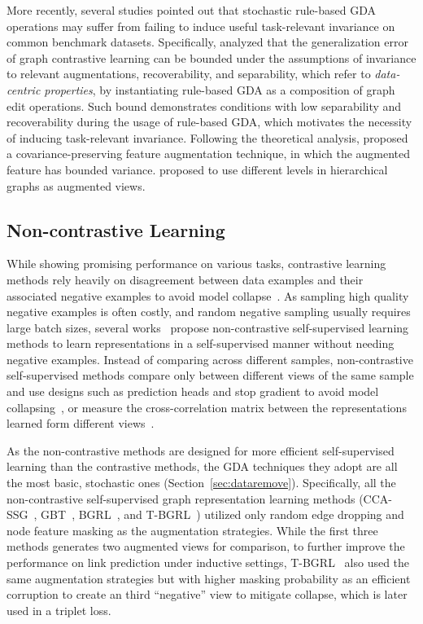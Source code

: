 \documentclass[11pt]{article}
\begin{document}
More recently, several studies \cite{suresh2021adversarial, trivedianalyzing,liu2023data} pointed out that stochastic rule-based GDA operations may suffer from failing to induce useful task-relevant invariance on common benchmark datasets. Specifically, \citet{trivedianalyzing} analyzed that the generalization error of graph contrastive learning can be bounded under the assumptions of invariance to relevant augmentations, recoverability, and separability, which refer to \textit{data-centric properties}, by instantiating rule-based GDA as a composition of graph edit operations. Such bound demonstrates conditions with low separability and recoverability during the usage of rule-based GDA, which motivates the necessity of inducing task-relevant invariance. 
Following the theoretical analysis, \citet{zhang2022costa} proposed a covariance-preserving feature augmentation technique, in which the augmented feature has bounded variance. \citet{wang2021multi} proposed to use different levels in hierarchical graphs as augmented views.

\subsection{Non-contrastive Learning}
\label{sec:noncontrastive}
While showing promising performance on various tasks, contrastive learning methods rely heavily on disagreement between data examples and their associated negative examples to avoid model collapse~\cite{grill2020bootstrap}. As sampling high quality negative examples is often costly, and random negative sampling usually requires large batch sizes, several works~\cite{grill2020bootstrap,zbontar2021barlow,balestriero2022contrastive} propose non-contrastive self-supervised learning methods to learn representations in a self-supervised manner without needing negative examples. Instead of comparing across different samples, non-contrastive self-supervised methods compare only between different views of the same sample and use designs such as prediction heads and stop gradient to avoid model collapsing~\cite{grill2020bootstrap}, or measure the cross-correlation matrix between the representations learned form different views~\cite{zbontar2021barlow}.

As the non-contrastive methods are designed for more efficient self-supervised learning than the contrastive methods, the GDA techniques they adopt are all the most basic, stochastic ones (Section~\ref{sec:dataremove}). Specifically, all the non-contrastive self-supervised graph representation learning methods (CCA-SSG~\cite{zhang2021canonical}, GBT~\cite{bielak2022graph}, BGRL~\cite{thakoor2022largescale}, and T-BGRL~\cite{shiao2022link}) utilized only random edge dropping and node feature masking as the augmentation strategies. 
While the first three methods generates two augmented views for comparison, to further improve the performance on link prediction under inductive settings, T-BGRL~\cite{shiao2022link} also used the same augmentation strategies but with higher masking probability as an efficient corruption to create an third ``negative'' view to mitigate collapse, which is later used in a triplet loss.
\end{document}
